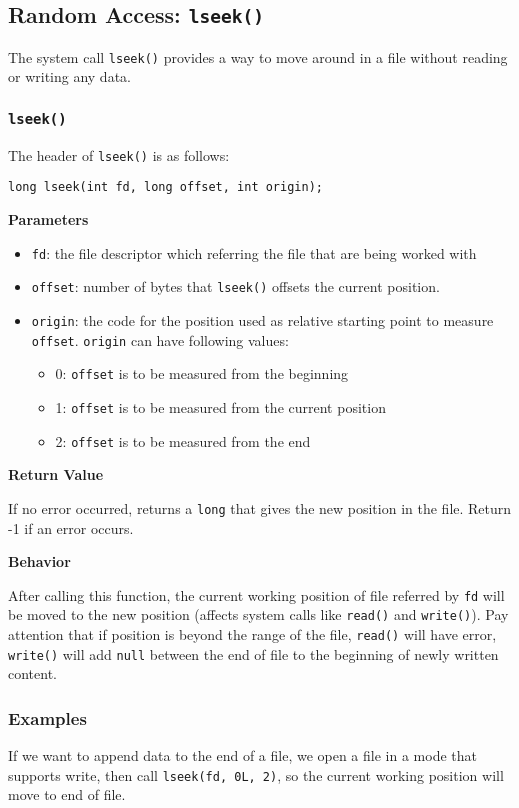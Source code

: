 \documentclass[12pt]{article}
\begin{document}
\subsection{Random Access: \texttt{lseek()}}
\label{sec:org106283c}
The system call \texttt{lseek()} provides a way to move around in a file without reading or writing any data.
\subsubsection{\texttt{lseek()}}
\label{sec:orgf1643a1}
The header of \texttt{lseek()} is as follows:
\begin{verbatim}
long lseek(int fd, long offset, int origin);
\end{verbatim}

\textbf{Parameters}

\begin{itemize}
\item \texttt{fd}: the file descriptor which referring the file that are being worked with
\item \texttt{offset}: number of bytes that \texttt{lseek()} offsets the current position.
\item \texttt{origin}: the code for the position used as relative starting point to measure \texttt{offset}. \texttt{origin} can have following values:
\begin{itemize}
\item 0: \texttt{offset} is to be measured from the beginning
\item 1: \texttt{offset} is to be measured from the current position
\item 2: \texttt{offset} is to be measured from the end
\end{itemize}
\end{itemize}

\textbf{Return Value}

If no error occurred, returns a \texttt{long} that gives the new position in the file. Return -1 if an error occurs.

\textbf{Behavior}

After calling this function, the current working position of file referred by \texttt{fd} will be moved to the new position (affects system calls like \texttt{read()} and \texttt{write()}). Pay attention that if position is beyond the range of the file, \texttt{read()} will have error, \texttt{write()} will add \texttt{null} between the end of file to the beginning of newly written content.
\subsubsection{Examples}
\label{sec:orga4dfe21}
If we want to append data to the end of a file, we open a file in a mode that supports write, then call \texttt{lseek(fd, 0L, 2)}, so the current working position will move to end of file.
\end{document}
